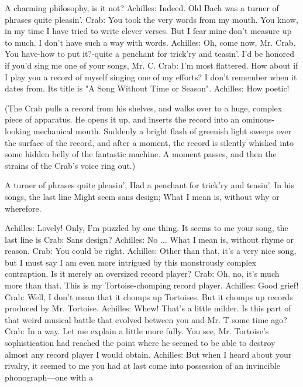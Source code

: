 {  A charming philosophy, is it not?
Achilles: Indeed. Old Bach was a turner of phrases quite pleasin'.
Crab: You took the very words from my mouth. You know, in my time I have tried to
  write clever verses. But I fear mine don't measure up to much. I don't have such a way
  with words.
Achilles: Oh, come now, Mr. Crab. You have-how to put it?-quite a penchant for trick'ry
  and teasin'. I'd be honored if you'd sing me one of your songs, Mr. C.
Crab: I'm most flattered. How about if I play you a record of myself singing one of my
  efforts? I don't remember when it dates from. Its title is "A Song Without Time or
  Season".
Achilles: How poetic!

  (The Crab pulls a record from his shelves, and walks over to a huge, complex piece
  of apparatus. He opens it up, and inserts the record into an ominous-looking
  mechanical mouth. Suddenly a bright flash of greenish light sweeps over the
  surface of the record, and after a moment, the record is silently whisked into some
  hidden belly of the fantastic machine. A moment passes, and then the strains of the
  Crab's voice ring out.)

                          A turner of phrases quite pleasin',
                        Had a penchant for trick'ry and teasin'.
                               In his songs, the last line
                               Might seem sans design;
                       What I mean is, without why or wherefore.

Achilles: Lovely! Only, I'm puzzled by one thing. It seems to me your song, the last line
  is
Crab: Sans design?
Achilles: No ... What I mean is, without rhyme or reason. Crab: You could be right.
Achilles: Other than that, it's a very nice song, but I must say I am even more intrigued
  by this monstrously complex contraption. Is it merely an oversized record player?
Crab: Oh, no, it's much more than that. This is my Tortoise-chomping record player.
  Achilles: Good grief!
Crab: Well, I don't mean that it chomps up Tortoises. But it chomps up records produced
  by Mr. Tortoise.
Achilles: Whew! That's a little milder. Is this part of that weird musical battle that
  evolved between you and Mr. T some time ago?
Crab: In a way. Let me explain a little more fully. You see, Mr. Tortoise's sophistication
  had reached the point where he seemed to be able to destroy almost any record player
  I would obtain.
Achilles: But when I heard about your rivalry, it seemed to me you had at last come into
  possession of an invincible phonograph—one with a




}
